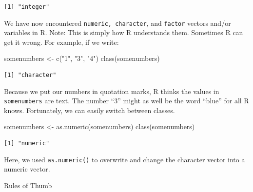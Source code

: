 \documentclass[
  letterpaper,
  DIV=11,
  numbers=noendperiod]{scrreprt}
\newenvironment{Shaded}{\begin{snugshade}}{\end{snugshade}}
\newcommand{\FunctionTok}[1]{\textcolor[rgb]{0.28,0.35,0.67}{#1}}
\newcommand{\NormalTok}[1]{\textcolor[rgb]{0.00,0.23,0.31}{#1}}
\newcommand{\OtherTok}[1]{\textcolor[rgb]{0.00,0.23,0.31}{#1}}
\newcommand{\StringTok}[1]{\textcolor[rgb]{0.13,0.47,0.30}{#1}}
\begin{document}
\begin{verbatim}
[1] "integer"
\end{verbatim}

We have now encountered \texttt{numeric,\ character}, and
\texttt{factor} vectors and/or variables in R. Note: This is simply how
R understands them. Sometimes R can get it wrong. For example, if we
write:

\begin{Shaded}
\begin{Highlighting}[]
\NormalTok{somenumbers }\OtherTok{\textless{}{-}} \FunctionTok{c}\NormalTok{(}\StringTok{"1"}\NormalTok{, }\StringTok{"3"}\NormalTok{, }\StringTok{"4"}\NormalTok{)}
\FunctionTok{class}\NormalTok{(somenumbers)}
\end{Highlighting}
\end{Shaded}

\begin{verbatim}
[1] "character"
\end{verbatim}

Because we put our numbers in quotation marks, R thinks the values in
\texttt{somenumbers} are text. The number ``3'' might as well be the
word ``blue'' for all R knows. Fortunately, we can easily switch between
classes.

\begin{Shaded}
\begin{Highlighting}[]
\NormalTok{somenumbers }\OtherTok{\textless{}{-}} \FunctionTok{as.numeric}\NormalTok{(somenumbers)}
\FunctionTok{class}\NormalTok{(somenumbers)}
\end{Highlighting}
\end{Shaded}

\begin{verbatim}
[1] "numeric"
\end{verbatim}

Here, we used \texttt{as.numeric()} to overwrite and change the
character vector into a numeric vector.

Rules of Thumb
\end{document}
